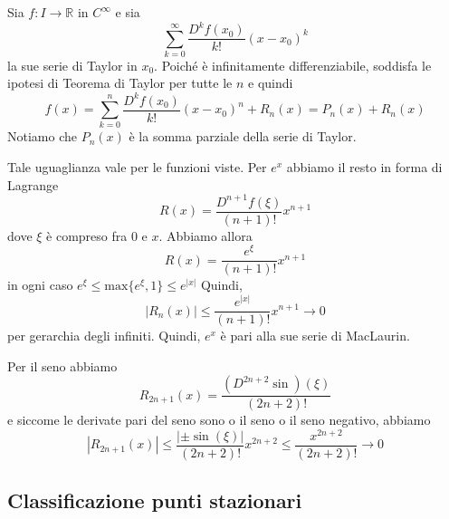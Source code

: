 \documentclass[a4paper]{article}
\begin{document}
Sia \(f\colon I \to \mathbb{R}\) in \(C^\infty\)
e sia
\[
    \sum_{k=0}^\infty \frac{D^kf(x_0)}{k!}{(x-x_0)}^k
\]
la sue serie di Taylor in \(x_0\).
Poiché è infinitamente differenziabile, soddisfa le ipotesi di Teorema di Taylor per tutte
le \(n\) e quindi
\[
    f(x) = \sum_{k=0}^n \frac{D^kf(x_0)}{k!}{(x-x_0)}^n + R_n(x)
    = P_n(x) + R_n(x)
\]
Notiamo che \(P_n(x)\) è la somma parziale della serie di Taylor.


Tale uguaglianza vale per le funzioni viste.
Per \(e^x\) abbiamo il resto in forma di Lagrange
\[
    R(x) = \frac{D^{n+1}f(\xi)}{(n+1)!} x^{n+1}
\]
dove \(\xi\) è compreso fra \(0\) e \(x\).
Abbiamo allora
\[
    R(x) = \frac{e^\xi}{(n+1)!}x^{n+1}
\]
in ogni caso \(e^\xi \leq \text{max}\{e^\xi, 1\} \leq e^{|x|}\)
Quindi,
\[
    |R_n(x)| \leq \frac{e^{|x|}}{(n+1)!} x^{n+1} \to 0
\]
per gerarchia degli infiniti.
Quindi, \(e^x\) è pari alla sue serie di MacLaurin.

Per il seno abbiamo
\[
    R_{2n+1}(x) = \frac{(D^{2n+2}\sin)(\xi)}{(2n+2)!}
\]
e siccome le derivate pari del seno sono o il seno o il seno negativo, abbiamo
\[
    |R_{2n+1}(x)| \leq \frac{|\pm\sin(\xi)|}{(2n+2)!}x^{2n+2}
    \leq \frac{x^{2n+2}}{(2n+2)!} \to 0
\]



\subsection{Classificazione punti stazionari}

\end{document}

